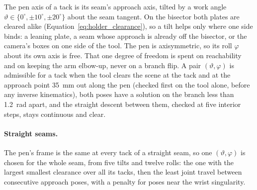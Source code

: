 The pen axis of a tack is its seam's approach axis, tilted by a work angle
$\vartheta\in\{0^\circ,\pm10^\circ,\pm20^\circ\}$ about the seam tangent. On the bisector both plates
are cleared alike (Equation~\ref{eq:holder_clearance}), so a tilt helps only where one side binds: a
leaning plate, a seam whose approach is already off the bisector, or the camera's boxes on one side of
the tool. The pen is axisymmetric, so its roll $\varphi$
about its own axis is free. That one degree of freedom is spent on reachability and on keeping the arm
elbow-up, never on a branch flip. A pair $(\vartheta,\varphi)$ is admissible for a tack when the tool
clears the scene at the tack and at the approach point 35~mm out along the pen (checked first on the
tool alone, before any inverse kinematics), both poses have a solution on the branch less than 1.2~rad
apart, and the straight descent between them, checked at five interior steps, stays continuous and clear.

\paragraph{Straight seams.} The pen's frame is the same at every tack of a straight seam, so one
$(\vartheta,\varphi)$ is chosen for the whole seam, from five tilts and twelve rolls: the one with the
largest smallest clearance over all its tacks, then the least joint travel between consecutive approach
poses, with a penalty for poses near the wrist singularity.

